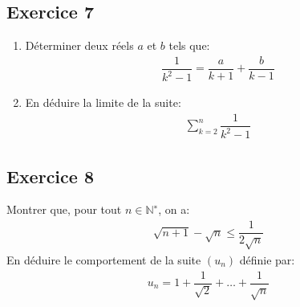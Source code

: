 \documentclass[letterpaper,10pt,french]{jupyterBook}
\begin{document}
\subsection{Exercice 7}
\label{\detokenize{exo2:exercice-7}}\begin{enumerate}
%
\item {} 
\sphinxAtStartPar
Déterminer deux réels \(a\) et \(b\) tels que:
\begin{equation*}
\begin{split}
    \dfrac{1}{k^2 - 1} = \dfrac{a}{k+1}+\dfrac{b}{k-1}
    \end{split}
\end{equation*}
\item {} 
\sphinxAtStartPar
En déduire la limite de la suite:
\begin{equation*}
\begin{split}
    \sum_{k=2}^{n}\dfrac{1}{k^2 - 1}
    \end{split}
\end{equation*}
\end{enumerate}


\subsection{Exercice 8}
\label{\detokenize{exo2:exercice-8}}
\sphinxAtStartPar
Montrer que, pour tout \(n\in \mathbb{N}^∗\), on a:
\begin{equation*}
\begin{split}
\sqrt{n+1}-\sqrt{n} \leq \dfrac{1}{2\sqrt{n}}
\end{split}
\end{equation*}
\sphinxAtStartPar
En déduire le comportement de la suite \((u_n)\) définie par:
\begin{equation*}
\begin{split}
u_n = 1 + \dfrac{1}{\sqrt{2}}+ \ldots + \dfrac{1}{\sqrt{n}}
\end{split}
\end{equation*}
\end{document}
